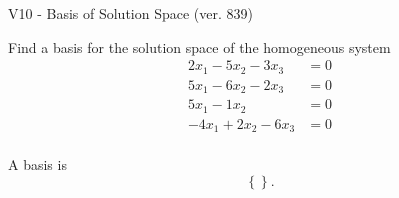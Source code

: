 \begin{exercise}
  \begin{exerciseTitle}V10 - Basis of Solution Space (ver. 839)\end{exerciseTitle}
  \begin{exerciseStatement}
    Find a basis for the solution space of the homogeneous system 
\begin{align*}
 2 x_ 1 -5 x_ 2 -3 x_ 3 &= 0  \\ 
  5 x_ 1 -6 x_ 2 -2 x_ 3 &= 0  \\ 
  5 x_ 1 -1 x_ 2 &= 0  \\ 
  -4 x_ 1 + 2 x_ 2 -6 x_ 3 &= 0  \\ 
 \end{align*}


 
  \end{exerciseStatement}

  \begin{exerciseAnswer}
   A basis is   
\[\left\{\right\}.\]

  


  \end{exerciseAnswer}
\end{exercise}